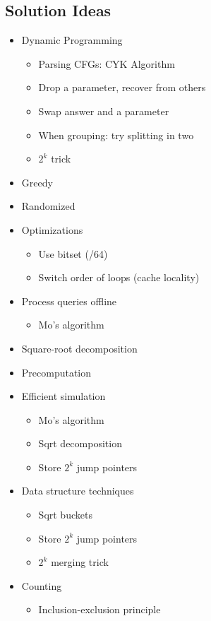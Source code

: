 \documentclass[9pt,a4paper,landscape,oneside]{amsart}
\newenvironment{myitemize}
{\begin{itemize}[leftmargin=.3cm]
	\setlength{\itemsep}{0pt}
	\setlength{\parskip}{0pt}
	\setlength{\parsep}{0pt}     }
{ \end{itemize}                  }
\begin{document}
\begin{multicols*}{3}
\subsection{Solution Ideas}
\begin{myitemize}
	\item Dynamic Programming
		\begin{myitemize}
			\item Parsing CFGs: CYK Algorithm
			\item Drop a parameter, recover from others
			\item Swap answer and a parameter
			\item When grouping: try splitting in two
			\item $2^k$ trick
		\end{myitemize}
	\item Greedy
	\item Randomized
	\item Optimizations
		\begin{myitemize}
			\item Use bitset (/64)
			\item Switch order of loops (cache locality)
		\end{myitemize}
	\item Process queries offline
		\begin{myitemize}
			\item Mo's algorithm
		\end{myitemize}
	\item Square-root decomposition
	\item Precomputation
	\item Efficient simulation
		\begin{myitemize}
			\item Mo's algorithm
			\item Sqrt decomposition
			\item Store $2^k$ jump pointers
		\end{myitemize}
	\item Data structure techniques
		\begin{myitemize}
			\item Sqrt buckets
			\item Store $2^k$ jump pointers
			\item $2^k$ merging trick
		\end{myitemize}
	\item Counting
		\begin{myitemize}
			\item Inclusion-exclusion principle

\end{myitemize}
\end{myitemize}
\end{multicols*}
\end{document}
